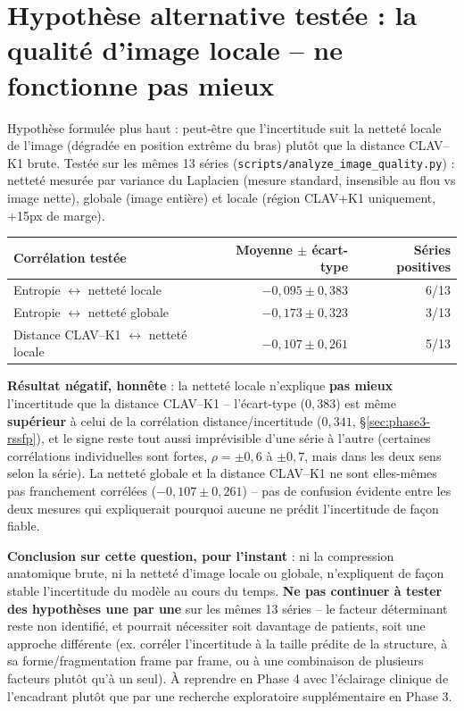 \documentclass[11pt,a4paper]{report}
\begin{document}
\section{Hypothèse alternative testée : la qualité d'image locale -- ne fonctionne
pas mieux}
\label{sec:phase3-qualite-image}

Hypothèse formulée plus haut : peut-être que l'incertitude suit la netteté locale
de l'image (dégradée en position extrême du bras) plutôt que la distance CLAV--K1
brute. Testée sur les mêmes 13 séries (\texttt{scripts/analyze\_image\_quality.py})
: netteté mesurée par variance du Laplacien (mesure standard, insensible au flou vs
image nette), globale (image entière) et locale (région CLAV+K1 uniquement, +15px
de marge).

\begin{center}
\begin{tabular}{lrr}
\toprule
Corrélation testée & Moyenne $\pm$ écart-type & Séries positives \\
\midrule
Entropie $\leftrightarrow$ netteté locale & $-0{,}095 \pm 0{,}383$ & 6/13 \\
Entropie $\leftrightarrow$ netteté globale & $-0{,}173 \pm 0{,}323$ & 3/13 \\
Distance CLAV--K1 $\leftrightarrow$ netteté locale & $-0{,}107 \pm 0{,}261$ & 5/13 \\
\bottomrule
\end{tabular}
\end{center}

\textbf{Résultat négatif, honnête} : la netteté locale n'explique \textbf{pas mieux}
l'incertitude que la distance CLAV--K1 -- l'écart-type ($0{,}383$) est même
\textbf{supérieur} à celui de la corrélation distance/incertitude ($0{,}341$,
\S\ref{sec:phase3-rssfp}), et le signe reste tout aussi imprévisible d'une série à
l'autre (certaines corrélations individuelles sont fortes, $\rho=\pm0{,}6$
à $\pm0{,}7$, mais dans les deux sens selon la série). La netteté globale et la
distance CLAV--K1 ne sont elles-mêmes pas franchement corrélées
($-0{,}107\pm0{,}261$) -- pas de confusion évidente entre les deux mesures qui
expliquerait pourquoi aucune ne prédit l'incertitude de façon fiable.

\textbf{Conclusion sur cette question, pour l'instant} : ni la compression
anatomique brute, ni la netteté d'image locale ou globale, n'expliquent de façon
stable l'incertitude du modèle au cours du temps. \textbf{Ne pas continuer à tester
des hypothèses une par une} sur les mêmes 13 séries -- le facteur déterminant reste
non identifié, et pourrait nécessiter soit davantage de patients, soit une approche
différente (ex. corréler l'incertitude à la taille prédite de la structure, à sa
forme/fragmentation frame par frame, ou à une combinaison de plusieurs facteurs
plutôt qu'à un seul). À reprendre en Phase 4 avec l'éclairage clinique de
l'encadrant plutôt que par une recherche exploratoire supplémentaire en Phase 3.
\end{document}
